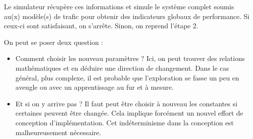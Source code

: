 Le simulateur récupère ces informations et simule le système complet soumis
au(x) modèle(s) de trafic pour obtenir des indicateurs globaux de performance.
Si ceux-ci sont satisfaisant, on s'arrête. Sinon, on reprend l'étape 2.

On peut se poser deux question :
\begin{itemize}
  \item Comment choisir les nouveau paramètres ? Ici, on peut trouver des
    relations mathématiques et en déduire une direction de changement. Dans le cas
    général, plus complexe, il est probable que l'exploration se fasse un peu en
    aveugle ou avec un apprentissage au fur et à mesure.
  \item Et si on y arrive pas ? Il faut peut être choisir à nouveau les
    constantes si certaines peuvent être changée. Cela implique forcément un
    nouvel effort de conception d'implémentation. Cet indéterminisme dans la
    conception est malheureusement nécessaire.
\end{itemize}


